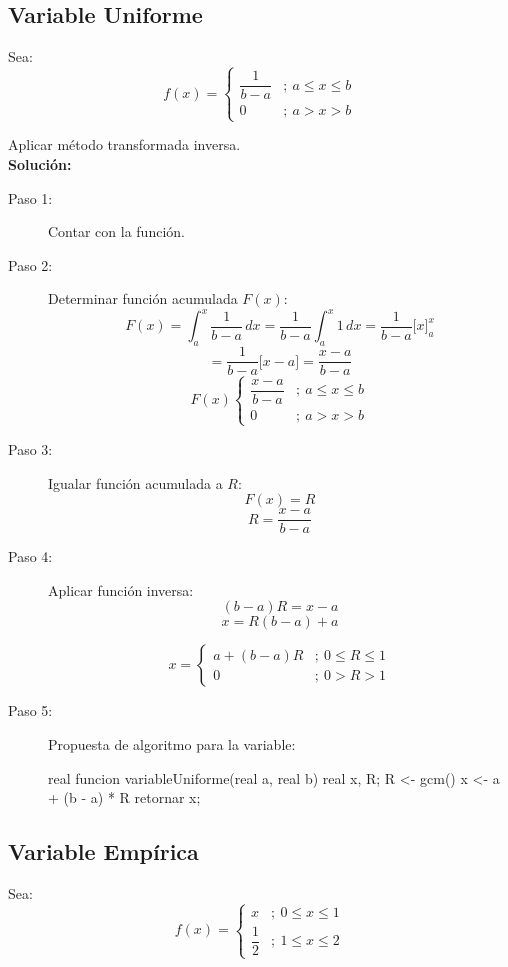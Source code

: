 \documentclass{article}
\begin{document}
\subsection{Variable Uniforme}
Sea:
$$f(x)=\begin{cases}\dfrac{1}{b-a} &;\ a \leq x \leq b \\ 0 &;\ a > x > b\end{cases}$$

Aplicar método transformada inversa.\\
\textbf{Solución:}

\begin{description}
    \item[Paso 1:] Contar con la función.

    \item[Paso 2:] Determinar función acumulada $F(x)$:
    $$ F(x) = \int_a^x \frac{1}{b-a}\,dx = \frac{1}{b-a}\int_a^x 1\,dx = \frac{1}{b-a}\Big[x\Big]_a^x $$
    $$ = \frac{1}{b-a}\Big[x - a\Big] = \frac{x-a}{b-a} $$
    $$F(x)\begin{cases}\dfrac{x-a}{b-a} &;\ a \leq x \leq b \\ 0 &;\ a > x > b\end{cases}$$

    \item[Paso 3:] Igualar función acumulada a $R$:
    $$ F(x) = R $$
    $$ R = \frac{x-a}{b-a} $$

    \item[Paso 4:] Aplicar función inversa:
    $$ (b-a)R = x - a $$
    $$ x = R(b-a) + a $$
    
    $$x = \begin{cases} a+(b-a)R &;\ 0 \leq R \leq 1 \\ 0 &;\ 0 > R > 1\end{cases}$$

    \item[Paso 5:] Propuesta de algoritmo para la variable:
    \begin{Algoritmo}{}
real funcion variableUniforme(real a, real b){
    real x, R;
    R <- gcm()
    x <- a + (b - a) * R
    retornar x;
}
    \end{Algoritmo}
\end{description}

\subsection{Variable Empírica}
Sea:
$$f(x)=\begin{cases}x &;\ 0 \leq x \leq 1 \\ \dfrac{1}{2} &;\ 1 \leq x \leq 2\end{cases}$$
\end{document}
